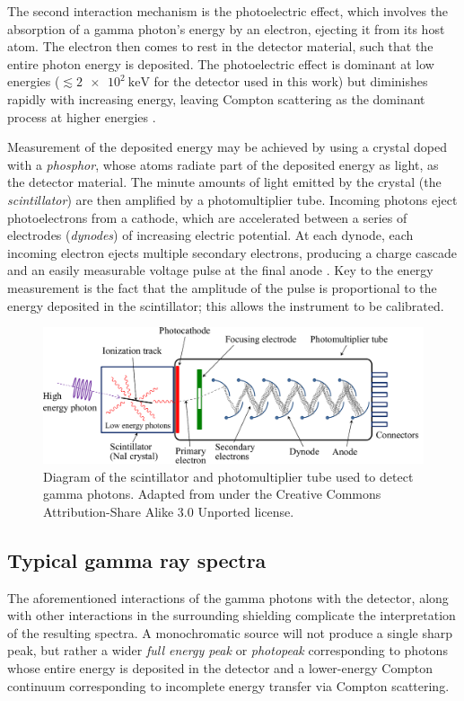 \documentclass[twocol]{ametsocV6.1}
\begin{document}
The second interaction mechanism is the photoelectric effect, which involves
the absorption of a gamma photon's energy by an electron, ejecting it from
its host atom. The electron then comes to rest in the detector material,
such that the entire photon energy is deposited. The photoelectric effect is
dominant at low energies ($\lesssim \SI{2e2}{\kilo\electronvolt}$ for
the detector used in this work) but diminishes rapidly with increasing
energy, leaving Compton scattering as the dominant process at higher energies
\citep{notes}.

Measurement of the deposited energy may be achieved by using a crystal
doped with a \emph{phosphor}, whose atoms radiate part of the deposited
energy as light, as the detector material. The minute amounts of light
emitted by the crystal (the \emph{scintillator}) are then amplified
by a photomultiplier tube. Incoming photons eject photoelectrons
from a cathode, which are accelerated between a series of electrodes
(\emph{dynodes}) of increasing electric potential.
At each dynode, each incoming electron ejects multiple secondary electrons,
producing a charge cascade and an easily measurable voltage pulse 
at the final anode \citep[p. 13]{hamamatsu_2007}. Key to the energy measurement
is the fact that the amplitude of the pulse is proportional to the
energy deposited in the scintillator; this allows the instrument to be
calibrated.

\begin{figure}[ht]
	\centering
	\includegraphics[width=\linewidth]{../figures/detection_diagram.pdf}
	\caption{
		Diagram of the scintillator and photomultiplier tube used to 
		detect gamma photons.
		Adapted from \cite{detector_diagram} under the
		Creative Commons Attribution-Share Alike 3.0 Unported license.
	}
\end{figure}

\subsection{Typical gamma ray spectra}
The aforementioned interactions of the gamma photons with the detector,
along with other interactions in the surrounding shielding
\citep{crosthwaite_2022} complicate
the interpretation of the resulting spectra. A monochromatic source will
not produce a single sharp peak, but rather a wider \emph{full energy peak}
or \emph{photopeak}
corresponding to photons whose entire energy is deposited in the detector
and a lower-energy Compton continuum corresponding to incomplete energy
transfer via Compton scattering.
\end{document}
